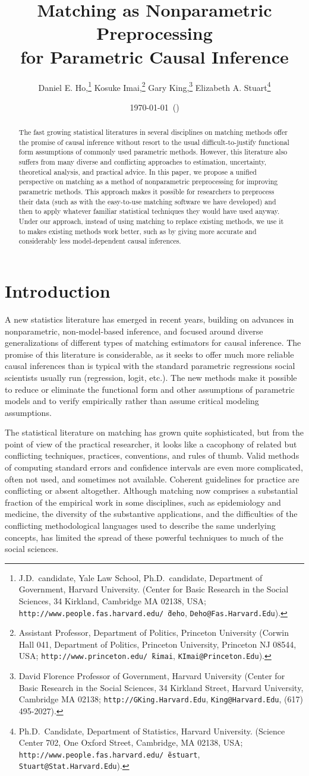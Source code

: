 \documentclass[11pt,titlepage]{article}
\title{Matching as Nonparametric Preprocessing\\
for Parametric Causal Inference}
\author{Daniel E. Ho,\thanks{J.D.\ candidate, Yale Law School, Ph.D.\
    candidate, Department of Government, Harvard
    University. (Center for Basic Research in the Social Sciences, 34
    Kirkland, Cambridge MA 02138, USA;
    \texttt{http://www.people.fas.harvard.edu/\~\,deho},
    \texttt{Deho@Fas.Harvard.Edu}).}
Kosuke Imai,\thanks{Assistant Professor, Department of Politics, Princeton
    University (Corwin Hall 041, Department of Politics, Princeton
    University, Princeton NJ 08544, USA;
    \texttt{http://www.princeton.edu/\~\,kimai},
    \texttt{KImai@Princeton.Edu}).}
Gary King,\thanks{David Florence Professor of Government, Harvard
  University (Center for Basic Research in the Social Sciences, 34
  Kirkland Street, Harvard University, Cambridge MA 02138;
  \texttt{http://GKing.Harvard.Edu}, \texttt{King@Harvard.Edu}, (617)
  495-2027).}
Elizabeth A. Stuart\thanks{Ph.D.\ Candidate, Department of Statistics, Harvard
  University. (Science Center 702, One Oxford Street, Cambridge, MA
  02138, USA;
  \texttt{http://www.people.fas.harvard.edu/\~\,estuart},
  \texttt{Stuart@Stat.Harvard.Edu}).}}
\date{\today\ (\printtime)}
\begin{document}
\maketitle

\begin{abstract}
  The fast growing statistical literatures in several disciplines on
  matching methods offer the promise of causal inference without
  resort to the usual difficult-to-justify functional form assumptions
  of commonly used parametric methods.  However, this literature also
  suffers from many diverse and conflicting approaches to estimation,
  uncertainty, theoretical analysis, and practical advice.  In this
  paper, we propose a unified perspective on matching as a method of
  nonparametric preprocessing for improving parametric methods.  This
  approach makes it possible for researchers to preprocess their data
  (such as with the easy-to-use matching software we have developed)
  and then to apply whatever familiar statistical techniques they
  would have used anyway.  Under our approach, instead of using
  matching to replace existing methods, we use it to makes existing
  methods work better, such as by giving more accurate and
  considerably less model-dependent causal inferences.
\end{abstract}
\baselineskip

\section{Introduction}

A new statistics literature has emerged in recent years, building on
advances in nonparametric, non-model-based inference, and focused
around diverse generalizations of different types of matching
estimators for causal inference.  The promise of this literature is
considerable, as it seeks to offer much more reliable causal
inferences than is typical with the standard parametric regressions
social scientists usually run (regression, logit, etc.).  The new
methods make it possible to reduce or eliminate the functional form
and other assumptions of parametric models and to verify empirically
rather than assume critical modeling assumptions.

The statistical literature on matching has grown quite sophisticated,
but from the point of view of the practical researcher, it looks like
a cacophony of related but conflicting techniques, practices,
conventions, and rules of thumb.  Valid methods of computing standard
errors and confidence intervals are even more complicated, often not
used, and sometimes not available.  Coherent guidelines for practice
are conflicting or absent altogether.  Although matching now comprises
a substantial fraction of the empirical work in some disciplines, such
as epidemiology and medicine, the diversity of the substantive
applications, and the difficulties of the conflicting methodological
languages used to describe the same underlying concepts, has limited
the spread of these powerful techniques to much of the social
sciences.
\end{document}

